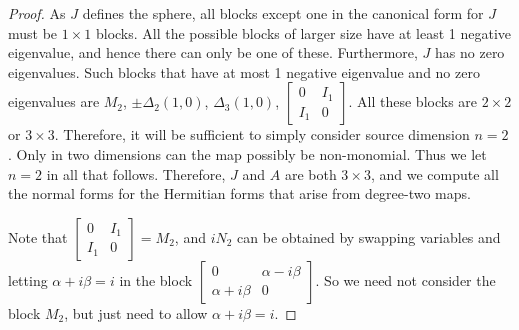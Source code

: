 \documentclass[12pt,openany]{book}
\theoremstyle{plain}
\theoremstyle{remark}
\theoremstyle{definition}
\theoremstyle{exercise}
\theoremstyle{example}
\begin{document}
\begin{proof}
As $J$ defines the sphere,
all blocks
except one in the canonical form for $J$ must be $1 \times 1$ blocks.
All the possible blocks of larger size have at least 1 negative
eigenvalue, and hence there can only be one of these.  Furthermore, $J$
has no zero eigenvalues.
Such blocks that have at most 1 negative eigenvalue and no zero eigenvalues
are
$M_2$, $\pm \Delta_2(1,0)$, $\Delta_3(1,0)$,
$\left[ \begin{smallmatrix} 0 & I_1 \\ I_1 & 0 \end{smallmatrix} \right]$.
All these blocks are $2 \times 2$ or $3 \times 3$.
Therefore, it will be sufficient to simply consider source dimension $n=2$.
Only in two dimensions can the map possibly be non-monomial.
Thus we let $n=2$ in all that follows.
Therefore,
$J$ and $A$ are both
$3 \times 3$, and we compute all the normal forms for the
Hermitian forms that arise from degree-two maps.

Note that 
$\left[ \begin{smallmatrix} 0 & I_1 \\ I_1 & 0 \end{smallmatrix} \right] =
M_2$, and $iN_2$ can be obtained by swapping variables and letting
$\alpha+i\beta = i$
in
the block 
$\left[ \begin{smallmatrix} 0 & \alpha-i\beta \\ \alpha+i\beta & 0 \end{smallmatrix} \right]$.
So we need not consider the block $M_2$, but just need to allow
$\alpha+i\beta = i$.


\end{proof}
\end{document}
